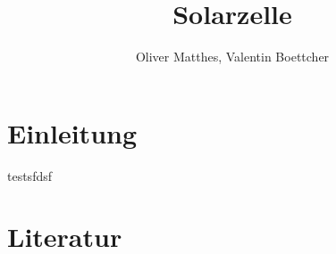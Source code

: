 \documentclass[slug=SZ, room=Hermann-Krone-Bau\,\ Labor\ 1.25, supervisor=Tim\ Ziegler]{../../Lab_Report_LaTeX/lab_report}
\title{Solarzelle}
\author{Oliver Matthes, Valentin Boettcher}
\begin{document}
\maketitle

\section{Einleitung}
\label{sec:einl}

testsfdsf

\section{Literatur}
\label{sec:literatur}

\printbibliography
\end{document}
